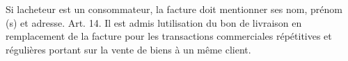 \documentclass[edit,12pt,a4paper,ChapStyle,oneside,doubleinterligne]{report}
\begin{document}
Si lacheteur est un consommateur, la facture doit mentionner ses nom, prénom (s) et adresse.
\newline
Art. 14.  Il est admis lutilisation du bon de livraison en
 remplacement de la facture  pour les transactions
 commerciales répétitives et régulières portant sur la vente
 de biens à un même client. \cite{journal80}


\printbibliography %
\end{document}

